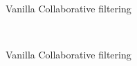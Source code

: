 \documentclass{article} %
\begin{document}
\begin{figure}[h]
	\centering
	\begin{subfigure}[b]{0.49\textwidth}
	\caption{Vanilla Collaborative filtering}
	\end{subfigure}
	~
	\begin{subfigure}[b]{0.49\textwidth}
	\caption{Vanilla Collaborative filtering}
	\end{subfigure}
	\\
	\begin{subfigure}[b]{0.49\textwidth}

\end{subfigure}
\end{figure}
\end{document}
